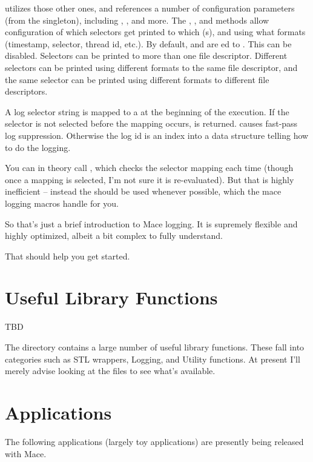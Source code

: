  utilizes those other ones, and references a number of
configuration parameters (from the  singleton),
including ,
, and more.
The , , and  methods allow configuration of which selectors get printed to
which (s), and using what formats (timestamp, selector, thread id,
etc.).  By default,  and
 are ed to .  This can be disabled.  Selectors can
be printed to more than one file descriptor.  Different selectors can be
printed using different formats to the same file descriptor, and the
same selector can be printed using different formats to different file
descriptors.

A log selector string is mapped to a  at the beginning of the
execution.  If the selector is not selected before the mapping occurs,
 is returned.   causes fast-pass log suppression.   Otherwise the
log id is an index into a data structure telling how to do the logging.

You can in theory call , which checks the
selector mapping each time (though once a mapping is selected, I'm not
sure it is re-evaluated).  But that is highly inefficient -- instead the
 should be used whenever possible, which the mace logging macros
handle for you.

So that's just a brief introduction to Mace logging.  It is supremely
flexible and highly optimized, albeit a bit complex to fully understand.

That should help you get started.


\section{Useful Library Functions}
\label{sec:lib}
TBD %

The  directory contains a large number of useful library functions.
These fall into categories such as STL wrappers, Logging, and Utility functions.  At
present I'll merely advise looking at the  files to see what's available.

\section{Applications}
\label{sec:applications}
The following applications (largely toy applications) are presently being released 
with Mace.  

